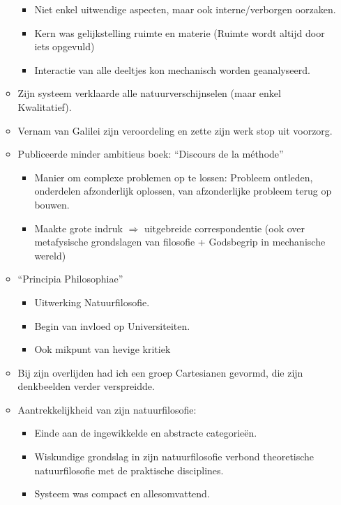\documentclass{article}
\begin{document}
\begin{itemize}
\begin{itemize}
        \begin{itemize}
          \item Niet enkel uitwendige aspecten, maar ook interne/verborgen oorzaken.
          \item Kern was gelijkstelling ruimte en materie (Ruimte wordt altijd door iets opgevuld)
          \item Interactie van alle deeltjes kon mechanisch worden geanalyseerd.
        \end{itemize}
        \item Zijn systeem verklaarde alle natuurverschijnselen (maar enkel Kwalitatief).
        \item Vernam van Galilei zijn veroordeling en zette zijn werk stop uit voorzorg.
        \item Publiceerde minder ambitieus boek: ``Discours de la méthode''
        \begin{itemize}
          \item Manier om complexe problemen op te lossen: Probleem ontleden, onderdelen afzonderlijk oplossen, van afzonderlijke probleem terug op bouwen.
          \item Maakte grote indruk $\Rightarrow$ uitgebreide correspondentie (ook over metafysische grondslagen van filosofie + Godsbegrip in mechanische wereld)
        \end{itemize}
        \item ``Principia Philosophiae''
        \begin{itemize}
          \item Uitwerking Natuurfilosofie.
          \item Begin van invloed op Universiteiten.
          \item Ook mikpunt van hevige kritiek
        \end{itemize}
        \item Bij zijn overlijden had ich een groep Cartesianen gevormd, die zijn denkbeelden verder verspreidde.
        \item Aantrekkelijkheid van zijn natuurfilosofie:
        \begin{itemize}
          \item Einde aan de ingewikkelde en abstracte categorie\"en.
          \item Wiskundige grondslag in zijn natuurfilosofie verbond theoretische natuurfilosofie met de praktische disciplines.
          \item Systeem was compact en allesomvattend.
        \end{itemize}

\end{itemize}
\end{itemize}
\end{document}
